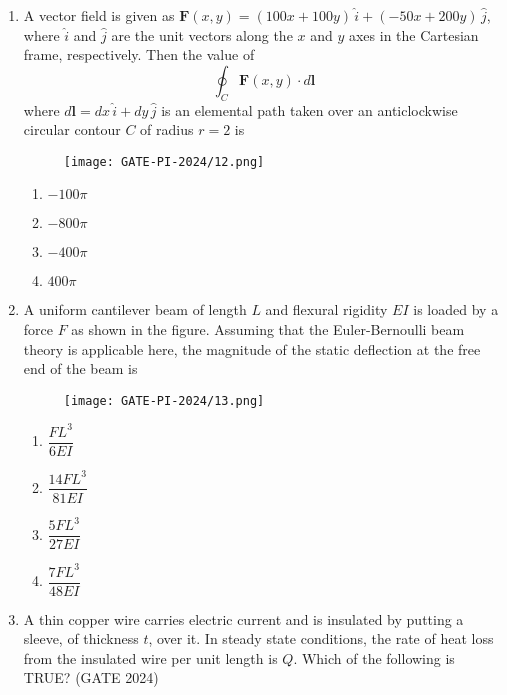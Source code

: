 \documentclass[journal,12pt,onecolumn]{IEEEtran}
\theoremstyle{remark}
\begin{document}
\begin{enumerate}
\item A vector field is given as $\mathbf{F}(x, y) = (100x + 100y)\,\hat{i} + (-50x + 200y)\, \hat{j}$, where $\hat{i}$ and $\hat{j}$ are the unit vectors along the $x$ and $y$ axes in the Cartesian frame, respectively. Then the value of
\[
\oint_C \mathbf{F}(x, y) \cdot d\mathbf{l}
\]
where $d\mathbf{l} = dx\,\hat{i} + dy\,\hat{j}$ is an elemental path taken over an anticlockwise circular contour $C$ of radius $r = 2$ is
\begin{figure}[H]
    \centering
    \texttt{[image: GATE-PI-2024/12.png]}
    \caption{}
    \label{12}
\end{figure}
\begin{multicols}{4}
\begin{enumerate}
    \item $-100\pi$
    \item $-800\pi$
    \item $-400\pi$
    \item $400\pi$
\end{enumerate}
\end{multicols}
\vspace{1cm}

\item A uniform cantilever beam of length $L$ and flexural rigidity $EI$ is loaded by a force $F$ as shown in the figure. Assuming that the Euler-Bernoulli beam theory is applicable here, the magnitude of the static deflection at the free end of the beam is
\begin{figure}[H]
    \centering
    \texttt{[image: GATE-PI-2024/13.png]} 
    \caption{}
    \label{13}
\end{figure}
\begin{multicols}{4}
\begin{enumerate}
    \item $\dfrac{FL^3}{6EI}$
    \item $\dfrac{14FL^3}{81EI}$
    \item $\dfrac{5FL^3}{27EI}$
    \item $\dfrac{7FL^3}{48EI}$
\end{enumerate}
\end{multicols}
\vspace{1cm}

\item A thin copper wire carries electric current and is insulated by putting a sleeve, of thickness $t$, over it. In steady state conditions, the rate of heat loss from the insulated wire per unit length is $Q$. Which of the following is TRUE?
\hfill{(GATE 2024)}


\end{enumerate}
\end{document}
